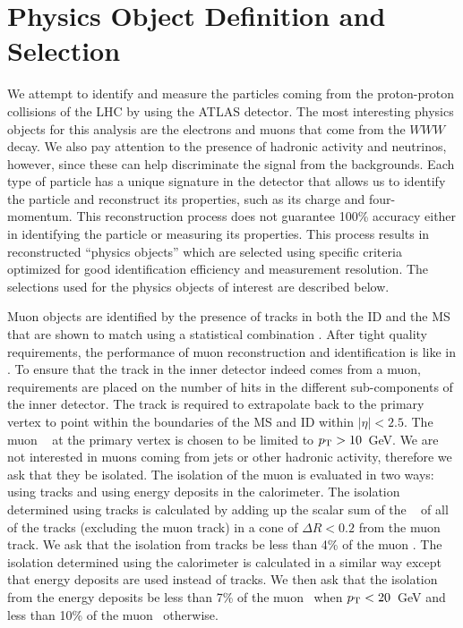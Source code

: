 \section{Physics Object Definition and Selection}
\label{sec:object_selection}
We attempt to identify and measure the particles coming from
the proton-proton collisions of the LHC by using the ATLAS detector.
The most interesting physics objects
for this analysis are the electrons and muons
that come from the $WWW$ decay. We also pay attention to 
the presence of hadronic activity and neutrinos, however, since these can
help discriminate the signal from the backgrounds.
Each type of particle has a unique signature in the detector
that allows us to identify the particle and reconstruct 
its properties, such as its charge and four-momentum. 
This reconstruction process does not guarantee
100\% accuracy either in identifying the particle or measuring its 
properties.
This process results in reconstructed ``physics objects''
which are selected using specific criteria optimized
for good identification efficiency and measurement resolution.
The selections used for the physics objects of interest are described below.


Muon objects are identified by the presence of tracks in both 
the ID and the MS that are shown 
to match using a statistical combination \cite{Hassani:2007cy}. 
After tight quality requirements, the performance of muon reconstruction
and identification is like in \cite{Aad:2014rra}.
To ensure that the track in the inner detector
indeed comes from a muon, requirements are placed
on the number of hits in the different sub-components of the inner detector.
The track is required to extrapolate back to the primary vertex 
to point within the boundaries of the MS and ID
within $|\eta|<2.5$.
The muon \pt~ at the primary vertex is chosen to be limited to $p_{\mathrm{T}} > 10$~GeV.
We are not interested in 
muons coming from jets or other hadronic activity, therefore we
ask that they be isolated. The isolation of the muon is evaluated
in two ways: using tracks and using energy deposits in the calorimeter.
The isolation determined using tracks is calculated by adding
up the scalar sum of the \pt~ of all of the tracks (excluding
the muon track) in a cone of $\Delta R< 0.2$ from the muon track.
We ask that the isolation from tracks be less than 4\% of the muon \pt.
The isolation determined using the calorimeter is calculated in
a similar way except that energy deposits are used instead of tracks.
We then ask that the isolation from the energy deposits 
be less than 7\% of the muon \pt~when $p_{\mathrm{T}} < 20$~GeV and 
less than 10\% of the muon \pt~otherwise. 





